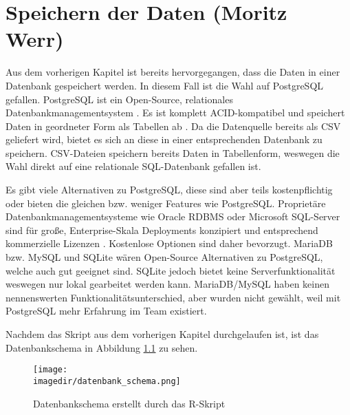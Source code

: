 \chapter{Speichern der Daten (Moritz Werr)}

Aus dem vorherigen Kapitel ist bereits hervorgegangen, dass die Daten in einer Datenbank gespeichert werden.
In diesem Fall ist die Wahl auf PostgreSQL gefallen.
PostgreSQL ist ein Open-Source, relationales Datenbankmanagementsystem \cite{noauthor_postgresql_nodate}. Es ist komplett ACID-kompatibel \cite{noauthor_postgresql_nodate} und speichert Daten in geordneter Form als Tabellen ab \cite{noauthor_51_2024}.
Da die Datenquelle bereits als CSV geliefert wird, bietet es sich an diese in einer entsprechenden Datenbank zu speichern.
CSV-Dateien speichern bereits Daten in Tabellenform, weswegen die Wahl direkt auf eine relationale SQL-Datenbank gefallen ist.

Es gibt viele Alternativen zu PostgreSQL, diese sind aber teils kostenpflichtig oder bieten die gleichen bzw. weniger Features wie PostgreSQL.
Proprietäre Datenbankmanagementsysteme wie Oracle RDBMS oder Microsoft SQL-Server sind für große, Enterprise-Skala Deployments konzipiert und entsprechend kommerzielle Lizenzen \cite{noauthor_microsoft_nodate}\cite{noauthor_oracle_nodate}.
Kostenlose Optionen sind daher bevorzugt.
MariaDB bzw. MySQL und SQLite wären Open-Source Alternativen zu PostgreSQL, welche auch gut geeignet sind\cite{noauthor_sqlite_nodate}\cite{noauthor_mysql_nodate}.
SQLite jedoch bietet keine Serverfunktionalität weswegen nur lokal gearbeitet werden kann\cite{noauthor_sqlite_nodate}.
MariaDB/MySQL haben keinen nennenswerten Funktionalitätsunterschied, aber wurden nicht gewählt, weil mit PostgreSQL mehr Erfahrung im Team existiert\cite{noauthor_mysql_nodate}\cite{noauthor_postgresql_nodate-1}.

Nachdem das Skript aus dem vorherigen Kapitel durchgelaufen ist, ist das Datenbankschema in Abbildung \ref{fig:datenbankschema} zu sehen.

\begin{figure}
	\centering 
	\texttt{[image: \\imagedir/datenbank\_schema.png]} 
	\captionsetup{format=hang}
	\caption[Datenbankschema]{\label{fig:datenbankschema}Datenbankschema erstellt durch das R-Skript}
\end{figure}